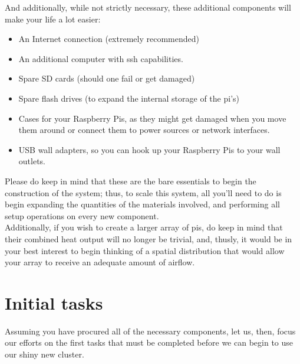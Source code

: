 \documentclass[]{article}
\begin{document}
                                        And additionally, while not strictly necessary, these additional components will make your life a lot 
                                        easier:

                                        \begin{itemize}
                                            \item An Internet connection (extremely recommended)
        \item An additional computer with ssh capabilities.
            \item Spare SD cards (should one fail or get damaged)
        \item Spare flash drives (to expand the internal storage of the pi's)
            \item Cases for your Raspberry Pis, as they might get damaged when you move them around or connect them 
                to power sources or network interfaces.
                    \item USB wall adapters, so you can hook up your Raspberry Pis to your wall outlets.
                    \end{itemize}

                    Please do keep in mind that these are the bare essentials to begin the construction of the system; thus, to 
                    scale this system, all you'll need to do is begin expanding the quantities of the materials involved, and 
                    performing all setup operations on every new component. \\

                    Additionally, if you wish to create a larger array of pis, do keep in mind that their combined heat output 
                    will no longer be trivial, and, thusly, it would be in your best interest to begin thinking of a spatial 
                    distribution that would allow your array to receive an adequate amount of airflow.

                    \section{Initial tasks}
                    Assuming you have procured all of the necessary components, let us, then, focus our efforts on the first 
                    tasks that must be completed before we can begin to use our shiny new cluster.
\end{document}
